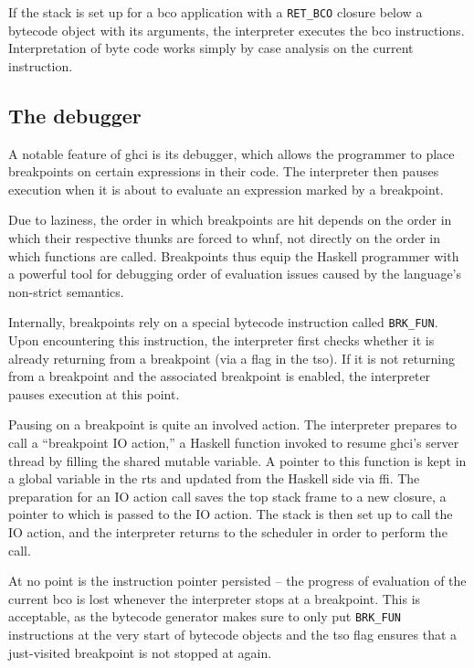 \documentclass[thesis=B,english]{FITthesis}[2019/12/23]
\begin{document}
If the stack is set up for a \acrshort{bco} application with a
\texttt{RET\_BCO} closure below a bytecode object with its arguments, the
interpreter executes the \acrshort{bco} instructions. Interpretation of byte
code works simply by case analysis on the current instruction.

\subsection*{The debugger}
A notable feature of \acrshort{ghci} is its debugger, which allows the
programmer to place breakpoints on certain expressions in their code. The
interpreter then pauses execution when it is about to evaluate an expression
marked by a breakpoint.

Due to laziness, the order in which breakpoints are hit depends on the order in
which their respective thunks are forced to \acrshort{whnf}, not directly on
the order in which functions are called. Breakpoints thus equip the Haskell
programmer with a powerful tool for debugging order of evaluation issues caused
by the language's non-strict semantics.

Internally, breakpoints rely on a special bytecode instruction called
\texttt{BRK\_FUN}. Upon encountering this instruction, the interpreter first
checks whether it is already returning from a breakpoint (via a flag in the
\acrshort{tso}). If it is not returning from a breakpoint and the associated
breakpoint is enabled, the interpreter pauses execution at this point.

Pausing on a breakpoint is quite an involved action. The interpreter prepares
to call a ``breakpoint IO action,'' a Haskell function invoked to resume
\acrshort{ghci}'s server thread by filling the shared mutable variable. A
pointer to this function is kept in a global variable in the \acrshort{rts} and
updated from the Haskell side via \acrshort{ffi}. The preparation for an IO
action call saves the top stack frame to a new closure, a pointer to which is
passed to the IO action. The stack is then set up to call the IO action, and
the interpreter returns to the scheduler in order to perform the call.

At no point is the instruction pointer persisted -- the progress of evaluation
of the current \acrshort{bco} is lost whenever the interpreter stops at a
breakpoint. This is acceptable, as the bytecode generator makes sure to only
put \texttt{BRK\_FUN} instructions at the very start of bytecode objects and
the \acrshort{tso} flag ensures that a just-visited breakpoint is not stopped
at again.
\end{document}
